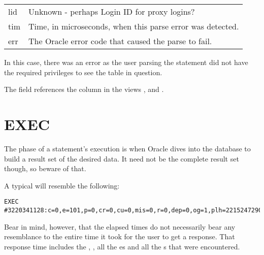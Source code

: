 \begin{longtable}[]{@{}l|l@{}}
\begin{minipage}[t]{0.14\columnwidth}\raggedright\strut
lid\strut
\end{minipage} & \begin{minipage}[t]{0.65\columnwidth}\raggedright\strut
Unknown - perhaps Login ID for proxy logins?\strut
\end{minipage}\tabularnewline
\begin{minipage}[t]{0.14\columnwidth}\raggedright\strut
tim\strut
\end{minipage} & \begin{minipage}[t]{0.65\columnwidth}\raggedright\strut
Time, in microseconds, when this parse error was detected.\strut
\end{minipage}\tabularnewline
\begin{minipage}[t]{0.14\columnwidth}\raggedright\strut
err\strut
\end{minipage} & \begin{minipage}[t]{0.65\columnwidth}\raggedright\strut
The Oracle error code that caused the parse to fail.\strut
\end{minipage}\tabularnewline
\bottomrule
\end{longtable}

In this case, there was an error  as the user parsing the statement did not have the required privileges to see the table in question.

The  field references the column  in the views ,  and .

\newpage\section{EXEC}\label{exec}

The  phase of a statement's execution is when Oracle dives into the database to build a result set of the desired data. It need not be the complete result set though, so beware of that.

A typical  will resemble the following:

\begin{lstlisting}[numbers=none,caption={Exec Line}]
EXEC #3220341128:c=0,e=101,p=0,cr=0,cu=0,mis=0,r=0,dep=0,og=1,plh=2215247290,tim=3520788606189
\end{lstlisting}

Bear in mind, however, that the  elapsed times do not necessarily bear any resemblance to the entire time it took for the user to get a response. That response time includes the , , all the es and all the s that were encountered.

